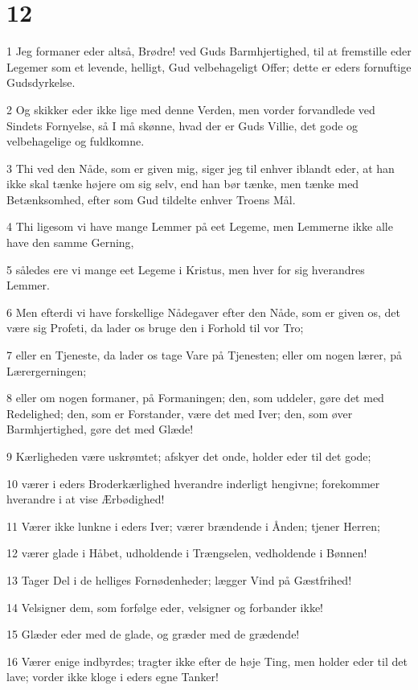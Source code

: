 \chapter{12}

\par 1 Jeg formaner eder altså, Brødre! ved Guds Barmhjertighed, til at fremstille eder Legemer som et levende, helligt, Gud velbehageligt Offer; dette er eders fornuftige Gudsdyrkelse.
\par 2 Og skikker eder ikke lige med denne Verden, men vorder forvandlede ved Sindets Fornyelse, så I må skønne, hvad der er Guds Villie, det gode og velbehagelige og fuldkomne.
\par 3 Thi ved den Nåde, som er given mig, siger jeg til enhver iblandt eder, at han ikke skal tænke højere om sig selv, end han bør tænke, men tænke med Betænksomhed, efter som Gud tildelte enhver Troens Mål.
\par 4 Thi ligesom vi have mange Lemmer på eet Legeme, men Lemmerne ikke alle have den samme Gerning,
\par 5 således ere vi mange eet Legeme i Kristus, men hver for sig hverandres Lemmer.
\par 6 Men efterdi vi have forskellige Nådegaver efter den Nåde, som er given os, det være sig Profeti, da lader os bruge den i Forhold til vor Tro;
\par 7 eller en Tjeneste, da lader os tage Vare på Tjenesten; eller om nogen lærer, på Lærergerningen;
\par 8 eller om nogen formaner, på Formaningen; den, som uddeler, gøre det med Redelighed; den, som er Forstander, være det med Iver; den, som øver Barmhjertighed, gøre det med Glæde!
\par 9 Kærligheden være uskrømtet; afskyer det onde, holder eder til det gode;
\par 10 værer i eders Broderkærlighed hverandre inderligt hengivne; forekommer hverandre i at vise Ærbødighed!
\par 11 Værer ikke lunkne i eders Iver; værer brændende i Ånden; tjener Herren;
\par 12 værer glade i Håbet, udholdende i Trængselen, vedholdende i Bønnen!
\par 13 Tager Del i de helliges Fornødenheder; lægger Vind på Gæstfrihed!
\par 14 Velsigner dem, som forfølge eder, velsigner og forbander ikke!
\par 15 Glæder eder med de glade, og græder med de grædende!
\par 16 Værer enige indbyrdes; tragter ikke efter de høje Ting, men holder eder til det lave; vorder ikke kloge i eders egne Tanker!
